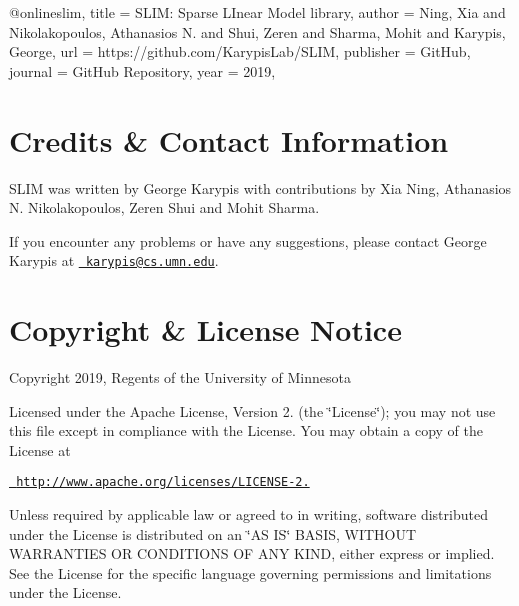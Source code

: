 \begin{DoxyVerb}@online{slim,
  title = {{SLIM}: Sparse LInear Model library},
  author = {Ning, Xia and Nikolakopoulos, Athanasios N. and Shui, Zeren and Sharma, Mohit and Karypis, George},
  url = {https://github.com/KarypisLab/SLIM},
  publisher = {GitHub},
  journal = {GitHub Repository},
  year = {2019},
}
\end{DoxyVerb}
\hypertarget{index_contact}{}\section{Credits \& Contact Information}\label{index_contact}
S\+L\+IM was written by George Karypis with contributions by Xia Ning, Athanasios N. Nikolakopoulos, Zeren Shui and Mohit Sharma.

If you encounter any problems or have any suggestions, please contact George Karypis at \href{mailto:karypis@cs.umn.edu}{\texttt{ karypis@cs.\+umn.\+edu}}.\hypertarget{index_license}{}\section{Copyright \& License Notice}\label{index_license}
Copyright 2019, Regents of the University of Minnesota

Licensed under the Apache License, Version 2. (the \char`\"{}\+License\char`\"{}); you may not use this file except in compliance with the License. You may obtain a copy of the License at

\href{http://www.apache.org/licenses/LICENSE-2.0}{\texttt{ http\+://www.\+apache.\+org/licenses/\+L\+I\+C\+E\+N\+S\+E-\/2.}}

Unless required by applicable law or agreed to in writing, software distributed under the License is distributed on an \char`\"{}\+A\+S I\+S\char`\"{} B\+A\+S\+IS, W\+I\+T\+H\+O\+UT W\+A\+R\+R\+A\+N\+T\+I\+ES OR C\+O\+N\+D\+I\+T\+I\+O\+NS OF A\+NY K\+I\+ND, either express or implied. See the License for the specific language governing permissions and limitations under the License. 